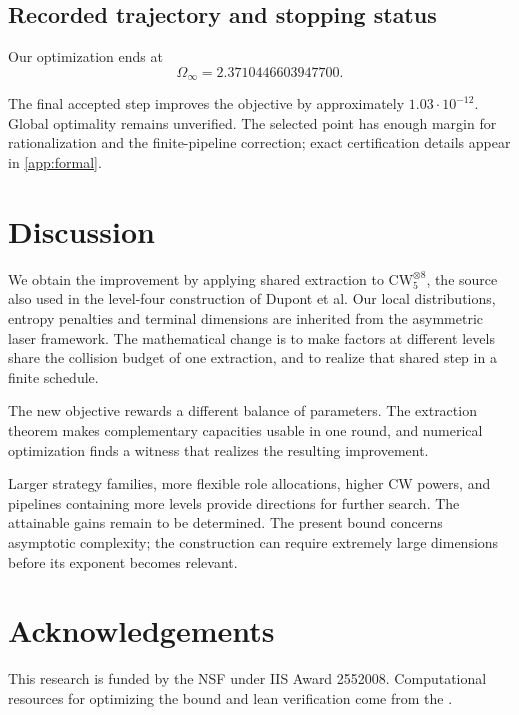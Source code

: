 \documentclass[11pt,a4paper]{article}
\newcommand{\CW}{\mathrm{CW}}
\begin{document}
\subsection{Recorded trajectory and stopping status}

Our optimization ends at
\begin{equation}\label{eq:search-endpoint}
\Omega_\infty=2.3710446603947700.
\end{equation}

The final accepted step improves the objective by approximately $1.03\cdot10^{-12}$. Global optimality remains unverified. The selected point has enough margin for rationalization and the finite-pipeline correction; exact certification details appear in \cref{app:formal}.

\section{Discussion}\label{sec:discussion}

We obtain the improvement by applying shared extraction to $\CW_5^{\otimes8}$, the source also used in the level-four construction of Dupont et al. Our local distributions, entropy penalties and terminal dimensions are inherited from the asymmetric laser framework. The mathematical change is to make factors at different levels share the collision budget of one extraction, and to realize that shared step in a finite schedule.

The new objective rewards a different balance of parameters. The extraction theorem makes complementary capacities usable in one round, and numerical optimization finds a witness that realizes the resulting improvement.

Larger strategy families, more flexible role allocations, higher CW powers, and pipelines containing more levels provide directions for further search. The attainable gains remain to be determined. The present bound concerns asymptotic complexity; the construction can require extremely large dimensions before its exponent becomes relevant.

\section{Acknowledgements}

This research is funded by the NSF under IIS Award 2552008. Computational resources for optimizing the bound and lean verification come from the \cite{Ohio_Supercomputer_Center1987-dl}.
\end{document}
